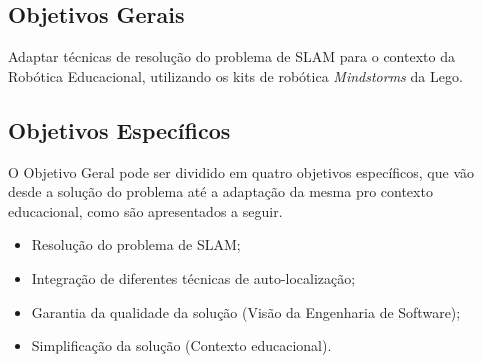 	\subsection{Objetivos Gerais} %
	\label{sub:objetivos_gerais}
	
		Adaptar técnicas de resolução do problema de SLAM para o contexto da Robótica Educacional, utilizando os kits de robótica \textit{Mindstorms} da Lego.


	\subsection{Objetivos Específicos} %
	\label{sub:objetivos_específicos}

		O Objetivo Geral pode ser dividido em quatro objetivos específicos, que vão desde a solução do problema até a adaptação da mesma pro contexto educacional, como são apresentados a seguir.
		 
	\begin{itemize}
		\item Resolução do problema de SLAM;
		\item Integração de diferentes técnicas de auto-localização;
		\item Garantia da qualidade da solução (Visão da Engenharia de Software);
		\item Simplificação da solução (Contexto educacional). 
	\end{itemize}
	
